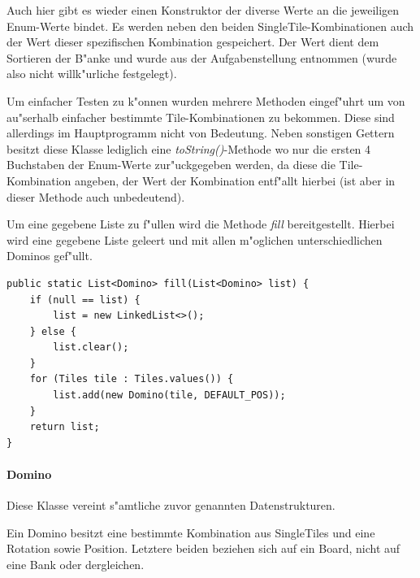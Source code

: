 Auch hier gibt es wieder einen Konstruktor der diverse Werte an die jeweiligen Enum-Werte bindet. Es werden neben den beiden SingleTile-Kombinationen auch der Wert dieser spezifischen Kombination gespeichert. Der Wert dient dem Sortieren der B"anke und wurde aus der Aufgabenstellung entnommen (wurde also nicht willk"urliche festgelegt). 

Um einfacher Testen zu k"onnen wurden mehrere Methoden eingef"uhrt um von au"serhalb einfacher bestimmte Tile-Kombinationen zu bekommen. Diese sind allerdings im Hauptprogramm nicht von Bedeutung. Neben sonstigen Gettern besitzt diese Klasse lediglich eine \emph{toString()}-Methode wo nur die ersten 4 Buchstaben der Enum-Werte zur"uckgegeben werden, da diese die Tile-Kombination angeben, der Wert der Kombination entf"allt hierbei (ist aber in dieser Methode auch unbedeutend).

Um eine gegebene Liste zu f"ullen wird die Methode \emph{fill} bereitgestellt. Hierbei wird eine gegebene Liste geleert und mit allen m"oglichen unterschiedlichen Dominos gef"ullt. 

\begin{lstlisting}[style=CodeHighlighting]
public static List<Domino> fill(List<Domino> list) {
    if (null == list) {
        list = new LinkedList<>();
    } else {
        list.clear();
    }
    for (Tiles tile : Tiles.values()) {
        list.add(new Domino(tile, DEFAULT_POS));
    }
    return list;
}
\end{lstlisting}

\paragraph{Domino}
\label{par:domino}
Diese Klasse vereint s"amtliche zuvor genannten Datenstrukturen. 

Ein Domino besitzt eine bestimmte Kombination aus SingleTiles und eine Rotation sowie Position. Letztere beiden beziehen sich auf ein Board, nicht auf eine Bank oder dergleichen. 